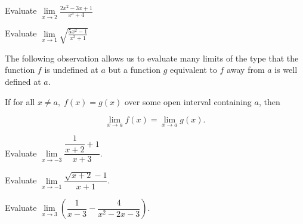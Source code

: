 \begin{example}
Evaluate
\(\lim\limits_{x\to 2}\frac{2x^2-3x+1}{x^3+4}\)
\end{example}
\vspace*{6\baselineskip}

\begin{example}
Evaluate
\(\lim\limits_{x\to 1}\sqrt{\frac{5x^2-1}{x^3+1}}\)
\end{example}
\vspace*{6\baselineskip}

The following observation allows us to evaluate many limits of the type
that the function \(f\) is undefined at \(a\) but a function \(g\)
equivalent to \(f\) away from \(a\) is well defined at \(a\).

\begin{theorem}
  If for all \(x\neq a,\;f(x)=g(x)\) over some open interval
  containing \(a\), then
  
  \[\lim\limits_{x\to a}f(x)=\lim\limits_{x\to a}g(x).\]
\end{theorem}

\begin{example}
Evaluate
\(\lim\limits_{x\to-3}\dfrac{\dfrac{1}{x+2}+1}{x+3}\).
\end{example}
\vspace*{6\baselineskip}

\begin{example}
Evaluate
\(\lim\limits_{x\to-1}\dfrac{\sqrt{x+2}-1}{x+1}\).
\end{example}
\vspace*{6\baselineskip}

\begin{example}
Evaluate
\(\lim\limits_{x\to3}\left(\dfrac{1}{x-3}-\dfrac{4}{x^2-2x-3}\right)\).
\end{example}
\vspace*{6\baselineskip}

